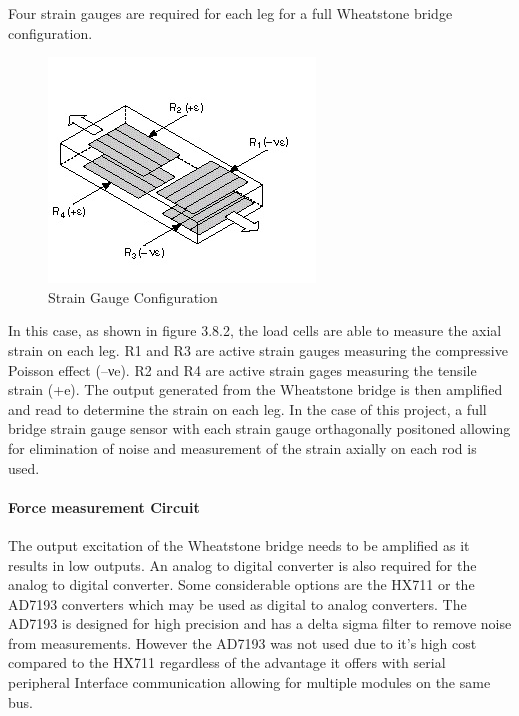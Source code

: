 Four strain gauges are required for each leg for a full Wheatstone bridge configuration. 
\begin{center}
	\begin{figure}[!h]
		\centering
		\includegraphics{Figures/loadConf}
		\caption[Strain Gauge Configuration]{Strain Gauge Configuration \cite{noauthor_measuring_nodate}}
	\end{figure}
\end{center}
In this case, as shown in figure 3.8.2, the load cells are able to measure the axial strain on each leg. R1 and R3 are active strain gauges measuring the compressive Poisson effect (–νe). R2 and R4 are active strain gages measuring the tensile strain (+e). The output generated from the Wheatstone bridge is then amplified and read to determine the strain on each leg.
In the case of this project, a full bridge strain gauge sensor with each strain gauge orthagonally positoned allowing for elimination of noise and measurement of the strain axially on each rod is used.

\paragraph{Force measurement Circuit}
The output excitation of the Wheatstone bridge needs to be amplified as it results in low outputs. An analog to digital converter is also required for the analog to digital converter. Some considerable options are the HX711 or the AD7193 converters which may be used as digital to analog converters. The AD7193 is designed for high precision and has a delta sigma filter to remove noise from measurements.  However the AD7193 was not used due to it's high cost compared to the HX711 regardless of the advantage it offers with serial peripheral Interface communication allowing for multiple modules on the same bus.

